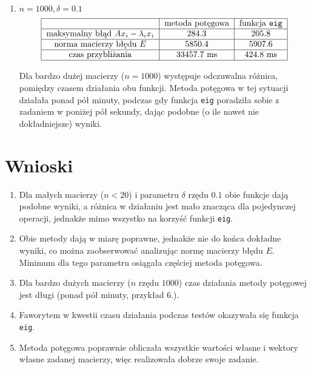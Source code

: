 \documentclass[12pt]{article}
\begin{document}
\begin{enumerate}[label=\textbf{Przykład \arabic*}]
		
		\item
		$n = 1000, \delta = 0.1$
		\begin{align*}
		\begin{tabular}{|c|c|c|}
			\hline
			                                        & metoda potęgowa & funkcja \texttt{eig} \\ \hline
			maksymalny błąd $A x_i - \lambda_i x_i$ &      284.3      &        205.8         \\ \hline
			       norma macierzy błędu $E$         &     5850.4      &        5907.6        \\ \hline
			           czas przybliżania            &   33457.7 ms    &       424.8 ms       \\ \hline
		\end{tabular}
		\end{align*}
		
		Dla bardzo dużej macierzy ($n = 1000$) występuje odczuwalna różnica, pomiędzy czasem działania obu funkcji. Metoda potęgowa w tej sytuacji działała ponad pół minuty, podczas gdy funkcja \texttt{eig} poradziła sobie z zadaniem w poniżej pół sekundy, dając podobne (o ile nawet nie dokładniejsze) wyniki.
	\end{enumerate}
	
	
	
	
	\section{Wnioski}
	\begin{enumerate}
		\item Dla małych macierzy ($n < 20$) i parametru $\delta$ rzędu $0.1$ obie funkcje dają podobne wyniki, a różnica w działaniu jest mało znacząca dla pojedynczej operacji, jednakże mimo wszystko na korzyść funkcji \texttt{eig}.
		
		\item Obie metody dają w miarę poprawne, jednakże nie do końca dokładne wyniki, co można zaobserwować analizując normę macierzy błędu $E$. Minimum dla tego parametru osiągała częściej metoda potęgowa.
		
		\item Dla bardzo dużych macierzy ($n$ rzędu $1000$) czas działania metody potęgowej jest długi (ponad pół minuty, przykład 6.).
		
		\item Faworytem w kwestii czasu działania podczas testów okazywała się funkcja \texttt{eig}.
		
		\item Metoda potęgowa poprawnie obliczała wszystkie wartości własne i wektory własne zadanej macierzy, więc realizowała dobrze swoje zadanie.
	\end{enumerate}
	
\end{document}
